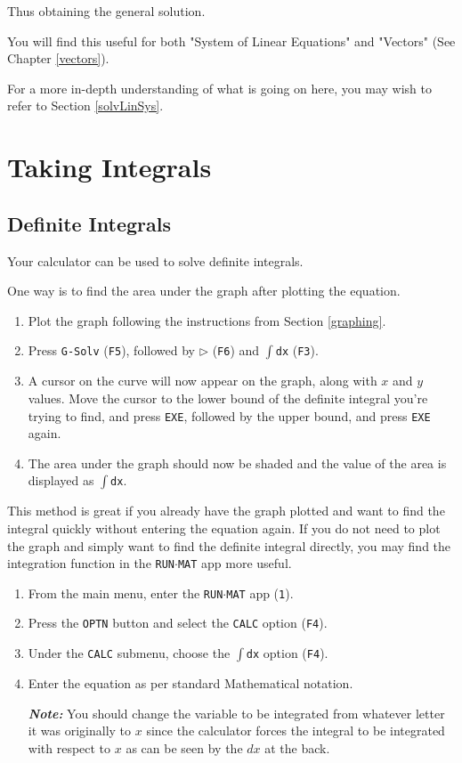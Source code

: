 \documentclass[a5paper,draft]{memoir}
\def\code#1{\texttt{#1}}
\def\note#1{\textbf{\textit{Note:}} #1}
\begin{document}
\begin{itemize}
	Thus obtaining the general solution. 
\end{itemize}

You will find this useful for both "System of Linear Equations" and "Vectors" (See Chapter \ref{vectors}). 

For a more in-depth understanding of what is going on here, you may wish to refer to Section \ref{solvLinSys}.

\section{Taking Integrals}
\subsection{Definite Integrals}
Your calculator can be used to solve definite integrals.

One way is to find the area under the graph after plotting the equation.

\begin{enumerate}
	\item Plot the graph following the instructions from Section \ref{graphing}.
	\item Press \code{G-Solv} (\code{F5}), followed by $\triangleright$ (\code{F6}) and \code{$\int$dx} (\code{F3}).
	\item A cursor on the curve will now appear on the graph, along with $x$ and $y$ values. Move the cursor to the lower bound of the definite integral you're trying to find, and press \code{EXE}, followed by the upper bound, and press \code{EXE} again.
	\item The area under the graph should now be shaded and the value of the area is displayed as \code{$\int$dx}.
\end{enumerate}

This method is great if you already have the graph plotted and want to find the integral quickly without entering the equation again. If you do not need to plot the graph and simply want to find the definite integral directly, you may find the integration function in the \code{RUN$\cdot$MAT} app more useful.

\begin{enumerate}
	\item From the main menu, enter the \code{RUN$\cdot$MAT} app (\code{1}).
	\item Press the \code{OPTN} button and select the \code{CALC} option (\code{F4}).
	\item Under the \code{CALC} submenu, choose the \code{$\int$dx} option (\code{F4}).
	\item Enter the equation as per standard Mathematical notation. 
	
	\note{You should change the variable to be integrated from whatever letter it was originally to $x$ since the calculator forces the integral to be integrated with respect to $x$ as can be seen by the $dx$ at the back.}
\end{enumerate}
\end{document}
